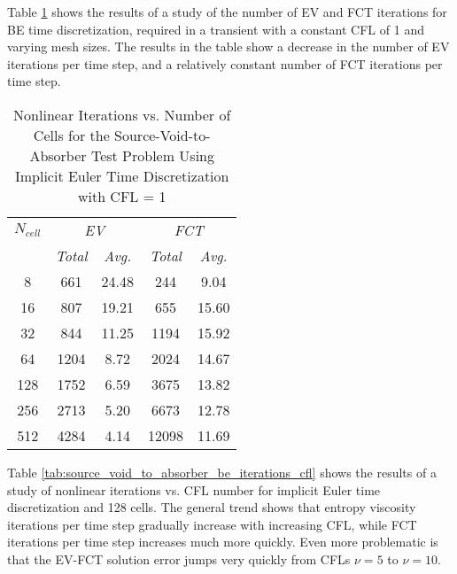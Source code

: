 Table \ref{tab:source_void_to_absorber_be_iterations_cells} shows the
results of a study of the number of EV and FCT iterations for
BE time discretization, required in
a transient with a constant CFL of 1 and varying mesh sizes. The
results in the table show a decrease in the number of EV iterations
per time step, and a relatively constant number of FCT iterations per
time step.

\begin{center}
\begin{table}[ht]
\caption{Nonlinear Iterations vs. Number of Cells for the
  Source-Void-to-Absorber Test Problem Using Implicit Euler Time Discretization
  with CFL = 1}
\label{tab:source_void_to_absorber_be_iterations_cells}
\begin{tabular}{c c c c c}\toprule
$N_{cell}$ & \multicolumn{2}{c}{\emph{EV}} & \multicolumn{2}{c}{\emph{FCT}}\\
           & \emph{Total} & \emph{Avg.}    &  \emph{Total} & \emph{Avg.}\\\midrule
  8 &  661 & 24.48 &   244 &  9.04\\
 16 &  807 & 19.21 &   655 & 15.60\\
 32 &  844 & 11.25 &  1194 & 15.92\\
 64 & 1204 &  8.72 &  2024 & 14.67\\
128 & 1752 &  6.59 &  3675 & 13.82\\
256 & 2713 &  5.20 &  6673 & 12.78\\
512 & 4284 &  4.14 & 12098 & 11.69\\
\bottomrule\end{tabular}
\end{table}
\end{center}

Table \ref{tab:source_void_to_absorber_be_iterations_cfl} shows
the results of a study of nonlinear iterations vs. CFL number for
implicit Euler time discretization and 128 cells. The general
trend shows that entropy viscosity iterations per time step gradually increase
with increasing CFL, while FCT iterations per time step increases
much more quickly. Even more problematic is that the EV-FCT solution
error jumps very quickly from CFLs $\nu=5$ to $\nu=10$.

